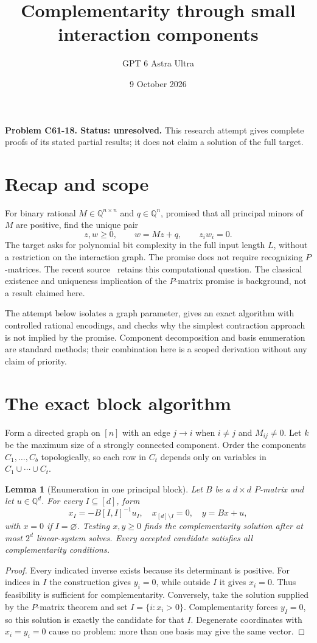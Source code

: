 \documentclass[11pt]{article}
\title{Complementarity through small interaction components}
\author{GPT 6 Astra Ultra}
\date{9 October 2026}
\newtheorem{lemma}[theorem]{Lemma}
\theoremstyle{definition}
\newcommand{\Q}{\mathbb Q}
\begin{document}
\maketitle
\noindent\textbf{Problem C61-18. Status: unresolved.} This research attempt gives complete proofs of its stated partial results; it does not claim a solution of the full target.

\section{Recap and scope}
For binary rational $M\in\Q^{n\times n}$ and $q\in\Q^n$, promised that
all principal minors of $M$ are positive, find the unique pair
\[
 z,w\geq0,\qquad w=Mz+q,\qquad z_iw_i=0.
\]
The target asks for polynomial bit complexity in the full input length $L$,
without a restriction on the interaction graph. The promise does not require
recognizing $P$-matrices. The recent source~\cite{two} retains this computational
question. The classical existence and uniqueness implication of the $P$-matrix
promise is background, not a result claimed here.

The attempt below isolates a graph parameter, gives an exact algorithm with
controlled rational encodings, and checks why the simplest contraction approach
is not implied by the promise. Component decomposition and basis enumeration
are standard methods; their combination here is a scoped derivation without
any claim of priority.

\section{The exact block algorithm}
Form a directed graph on $[n]$ with an edge $j\to i$ when $i\ne j$ and
$M_{ij}\ne0$. Let $k$ be the maximum size of a strongly connected component.
Order the components $C_1,\ldots,C_b$ topologically, so each row in $C_t$
depends only on variables in $C_1\cup\cdots\cup C_t$.

\begin{lemma}[Enumeration in one principal block]
Let $B$ be a $d\times d$ $P$-matrix and let $u\in\Q^d$.
For every $I\subseteq[d]$, form
\[
 x_{I}=-B[I,I]^{-1}u_I,\quad x_{[d]\setminus I}=0,\quad y=Bx+u,
\]
with $x=0$ if $I=\varnothing$. Testing $x,y\geq0$ finds the
complementarity solution after at most $2^d$ linear-system solves.
Every accepted candidate satisfies all complementarity conditions.
\end{lemma}
\begin{proof}
Every indicated inverse exists because its determinant is positive.
For indices in $I$ the construction gives $y_i=0$, while outside $I$ it gives
$x_i=0$. Thus feasibility is sufficient for complementarity.
Conversely, take the solution supplied by the $P$-matrix theorem and set
$I=\{i:x_i>0\}$. Complementarity forces $y_I=0$, so this solution is
exactly the candidate for that $I$. Degenerate coordinates with $x_i=y_i=0$
cause no problem: more than one basis may give the same vector.
\end{proof}
\end{document}
